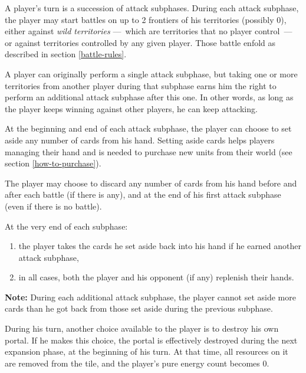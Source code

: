 \documentclass[a4paper]{article}
\begin{document}
        A player's turn is a succession of attack subphases.
        During each attack subphase, the player may start battles
        on up to 2 frontiers of his territories (possibly 0),
        either against \textit{wild territories}
        ---~which are territories that no player control~---
        or against territories controlled by any given player.
        Those battle enfold as described in section \ref{battle-rules}.
        
        A player can originally perform a single attack subphase,
        but taking one or more territories from another player during that subphase
        earns him the right to perform an additional attack subphase after this one.
        In other words, as long as the player keeps winning against other players,
        he can keep attacking.
        
        At the beginning and end of each attack subphase,
        the player can choose to set aside any number of cards from his hand.
        Setting aside cards helps players managing their hand
        and is needed to purchase new units from their world
        (see section \ref{how-to-purchase}).
        
        The player may choose to discard any number of cards from his hand
        before and after each battle (if there is any), and at the end of his first
        attack subphase (even if there is no battle).
        
        At the very end of each subphase:
        \vspace{-1.3em}
        \begin{enumerate}
            \item the player takes the cards he set aside back into his hand if he earned
                     another attack subphase,
            \item in all cases, both the player and his opponent (if any)
                     replenish their hands.
        \end{enumerate}
        
        \textbf{Note:} During each additional attack subphase,
                              the player cannot set aside more cards than he got back from
                              those set aside during the previous subphase.
        
        During his turn, another choice available to the player
        is to destroy his own portal.
        If he makes this choice, the portal is effectively destroyed
        during the next expansion phase, at the beginning of his turn.
        At that time, all resources on it are removed from the tile,
        and the player's pure energy count becomes 0. 
        
\end{document}
